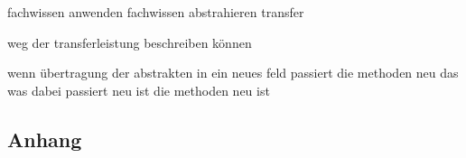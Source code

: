 \documentclass[12pt, twoside]{article}
\begin{document}
fachwissen anwenden
fachwissen abstrahieren
	transfer

	weg der transferleistung beschreiben können


wenn übertragung der abstrakten in ein neues feld passiert
	die methoden neu
	das was dabei passiert neu ist
		die methoden neu ist

\begin{appendix} 
  \section*{Anhang} 
  \renewcommand{\thesubsection}{\Alph{subsection}}
 
  

\end{appendix} 

\printbibliography{}

 

% 
% 
\end{document}
